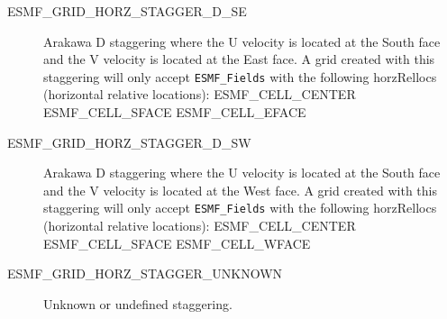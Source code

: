 \begin{description}
    \item [ESMF\_GRID\_HORZ\_STAGGER\_D\_SE]
          Arakawa D staggering where the U velocity is located at the South face
          and the V velocity is located at the East face.  A grid created with
          this staggering will only accept {\tt ESMF\_Fields} with the following
          horzRellocs (horizontal relative locations):
              ESMF\_CELL\_CENTER
              ESMF\_CELL\_SFACE
              ESMF\_CELL\_EFACE
 
    \item [ESMF\_GRID\_HORZ\_STAGGER\_D\_SW]
          Arakawa D staggering where the U velocity is located at the South face
          and the V velocity is located at the West face.  A grid created with
          this staggering will only accept {\tt ESMF\_Fields} with the following
          horzRellocs (horizontal relative locations):
              ESMF\_CELL\_CENTER
              ESMF\_CELL\_SFACE
              ESMF\_CELL\_WFACE


    \item [ESMF\_GRID\_HORZ\_STAGGER\_UNKNOWN]
          Unknown or undefined staggering.

 \end{description}


% 
% 


